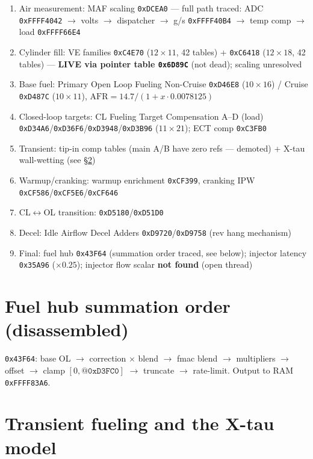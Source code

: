 \documentclass[11pt,a4paper]{book}
\begin{document}
\begin{enumerate}
  \item Air measurement: MAF scaling \texttt{0xDCEA0} --- full path traced:
        ADC \texttt{0xFFFF4042} $\rightarrow$ volts $\rightarrow$ dispatcher
        $\rightarrow$ g/s \texttt{0xFFFF40B4} $\rightarrow$ temp comp
        $\rightarrow$ load \texttt{0xFFFF66E4}
  \item Cylinder fill: VE families \texttt{0xC4E70} ($12\times11$, 42 tables)
        + \texttt{0xC6418} ($12\times18$, 42 tables) --- \textbf{LIVE via
        pointer table \texttt{0x6D89C}} (not dead); scaling unresolved
  \item Base fuel: Primary Open Loop Fueling Non-Cruise \texttt{0xD46E8}
        ($10\times16$) / Cruise \texttt{0xD487C} ($10\times11$),
        $\mathrm{AFR} = 14.7 / (1 + x \cdot 0.0078125)$
  \item Closed-loop targets: CL Fueling Target Compensation A--D (load)
        \texttt{0xD34A6}/\texttt{0xD36F6}/\texttt{0xD3948}/\texttt{0xD3B96}
        ($11\times21$); ECT comp \texttt{0xC3FB0}
  \item Transient: tip-in comp tables (main A/B have zero refs --- demoted) +
        X-tau wall-wetting (see \S\ref{sec:xtau})
  \item Warmup/cranking: warmup enrichment \texttt{0xCF399},
        cranking IPW \texttt{0xCF586}/\texttt{0xCF5E6}/\texttt{0xCF646}
  \item CL$\leftrightarrow$OL transition: \texttt{0xD5180}/\texttt{0xD51D0}
  \item Decel: Idle Airflow Decel Adders \texttt{0xD9720}/\texttt{0xD9758}
        (rev hang mechanism)
  \item Final: fuel hub \texttt{0x43F64} (summation order traced, see below);
        injector latency \texttt{0x35A96} ($\times 0.25$); injector flow
        scalar \textbf{not found} (open thread)
\end{enumerate}

\section{Fuel hub summation order (disassembled)}

\texttt{0x43F64}: base OL $\rightarrow$ correction $\times$ blend
$\rightarrow$ fmac blend $\rightarrow$ multipliers $\rightarrow$ offset
$\rightarrow$ clamp $[0, \texttt{@0xD3FC0}]$ $\rightarrow$ truncate
$\rightarrow$ rate-limit. Output to RAM \texttt{0xFFFF83A6}.

\section{Transient fueling and the X-tau model}
\label{sec:xtau}
\end{document}
